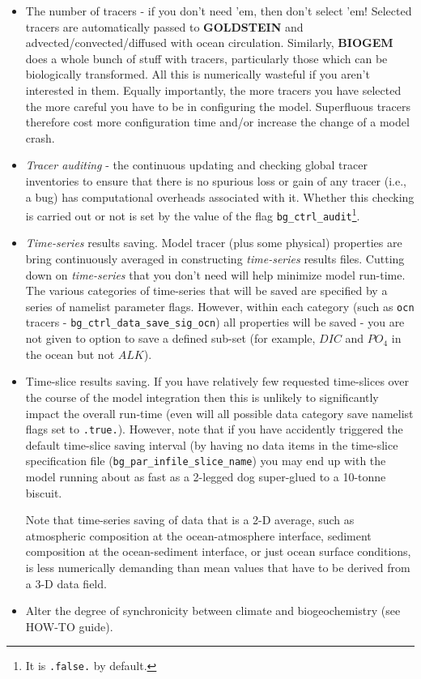 \documentclass[11pt,fleqn]{book} %
\begin{document}
\begin{itemize}[noitemsep]
\setlength{\itemindent}{.2in}

\item   The number of tracers - if you don't need 'em, then don't select 'em! Selected tracers are automatically passed to \textbf{GOLDSTEIN} and advected/convected/diffused with ocean circulation. Similarly, \textbf{BIOGEM} does a whole bunch of stuff with tracers, particularly those which can be biologically transformed. All this is numerically wasteful if you aren't interested in them. Equally importantly, the more tracers you have selected the more careful you have to be in configuring the model. Superfluous tracers therefore cost more configuration time and/or increase the change of a model crash.

\item \textit{Tracer auditing} - the  continuous updating and checking global tracer inventories to ensure that there is no spurious loss or gain of any tracer (i.e., a bug) has computational overheads associated with it. Whether this checking is carried out or not is set by the value of the flag \texttt{bg\_ctrl\_audit}\footnote{It is \texttt{.false.} by default.}.

\item \textit{Time-series} results saving. Model tracer (plus some physical) properties are bring continuously averaged in constructing \textit{time-series} results files. Cutting down on \textit{time-series} that you don't need will help minimize model run-time. The various categories of time-series that will be saved are specified by a series of namelist parameter flags. However, within each category (such as \texttt{ocn} tracers - \texttt{bg\_ctrl\_data\_save\_sig\_ocn}) all properties will be saved - you are not given to option to save a defined sub-set (for example, \(DIC\) and \(PO_{4}\) in the ocean but not \(ALK\)).

\item Time-slice results saving. If you have relatively few requested time-slices over the course of the model integration then this is unlikely to significantly impact the overall run-time (even will all possible data category save namelist flags set to \texttt{.true.}). However, note that if you have accidently triggered the default time-slice saving interval (by having no data items in the time-slice specification file (\texttt{bg\_par\_infile\_slice\_name}) you may end up with the model running about as fast as a 2-legged dog super-glued to a 10-tonne biscuit.

 Note that time-series saving of data that is a 2-D average, such as atmospheric composition at the ocean-atmosphere interface, sediment composition at the ocean-sediment interface, or just ocean surface conditions, is less numerically demanding than mean values that have to be derived from a 3-D data field.

\item Alter the degree of synchronicity between climate and biogeochemistry (see  HOW-TO guide).

\end{itemize}
\end{document}
